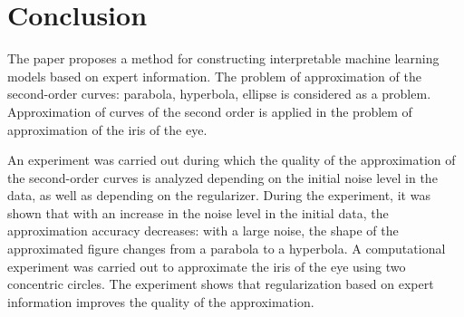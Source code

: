 \section{Conclusion}
\label{sec:6}
The paper proposes a method for constructing interpretable machine learning models based on expert information. The problem of approximation of the second-order curves: parabola, hyperbola, ellipse is considered as a problem. Approximation of curves of the second order is applied in the problem of approximation of the iris of the eye.

An experiment was carried out during which the quality of the approximation of the second-order curves is analyzed depending on the initial noise level in the data, as well as depending on the regularizer. During the experiment, it was shown that with an increase in the noise level in the initial data, the approximation accuracy decreases: with a large noise, the shape of the approximated figure changes from a parabola to a hyperbola.
A computational experiment was carried out to approximate the iris of the eye using two concentric circles. The experiment shows that regularization based on expert information improves the quality of the approximation.



%
%



